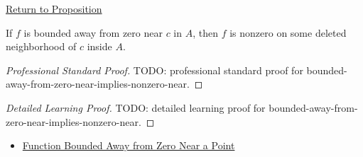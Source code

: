 \newpage
{}
\label{prf:bounded-away-from-zero-near-implies-nonzero-near}

\begin{remark*}[Return]
\hyperref[prop:bounded-away-from-zero-near-implies-nonzero-near]{Return to Proposition}
\end{remark*}

\begin{proposition*}
If \(f\) is bounded away from zero near \(c\) in \(A\), then \(f\) is
nonzero on some deleted neighborhood of \(c\) inside \(A\).
\end{proposition*}

\begin{proof}[Professional Standard Proof]
\LRAProofBodyStart
TODO: professional standard proof for bounded-away-from-zero-near-implies-nonzero-near.
\end{proof}

\begin{proof}[Detailed Learning Proof]
\LRAProofBodyStart
TODO: detailed learning proof for bounded-away-from-zero-near-implies-nonzero-near.
\end{proof}

\begin{remark*}
\end{remark*}

\begin{dependencies}
\begin{itemize}
  \item \hyperref[def:function-bounded-away-from-zero-near]{Function Bounded Away from Zero Near a Point}
\end{itemize}
\end{dependencies}

\clearpage
